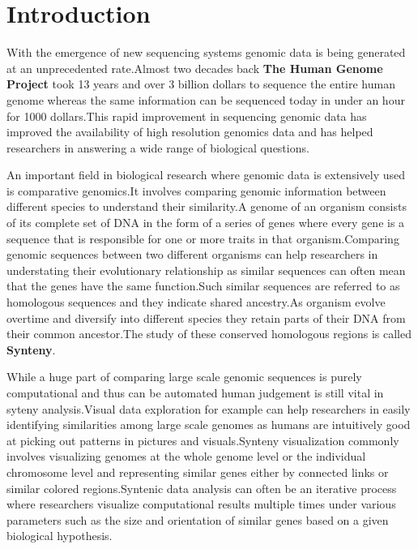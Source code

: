 \chapter{Introduction}

With the emergence of new sequencing systems genomic data is being generated at an unprecedented rate.Almost two decades back \textbf{The Human Genome Project} took 13 years and over 3 billion dollars to sequence the entire human genome whereas the same information can be sequenced today in under an hour for 1000 dollars.This rapid improvement in sequencing genomic data has improved the availability of high resolution genomics data and has helped researchers in answering a wide range of biological questions.




An important field in biological research where genomic data is extensively used is comparative genomics.It involves comparing genomic information between different species to understand their similarity.A genome of an organism consists of its complete set of DNA in the form of a series of genes where every gene is a sequence that is responsible for one or more traits in that organism.Comparing genomic sequences between two different organisms can help researchers in understating their evolutionary relationship as similar sequences can often mean that the genes have the same function.Such similar sequences are referred to as homologous sequences and they indicate shared ancestry.As organism evolve overtime and diversify into different species they retain parts of their DNA from their common ancestor.The study of these conserved homologous regions is called \textbf{Synteny}. 

While a huge part of comparing large scale genomic sequences is purely computational and thus can be automated human judgement is still vital in syteny analysis.Visual data exploration for example can help researchers in easily identifying similarities among large scale genomes as humans are intuitively good at picking out patterns in pictures and visuals.Synteny visualization commonly involves visualizing genomes at the whole genome level or the individual chromosome level and representing similar genes either by connected links or similar colored regions.Syntenic data analysis can often be an iterative process where researchers visualize computational results multiple times under various parameters such as the size and orientation of similar genes based on a given biological hypothesis.

